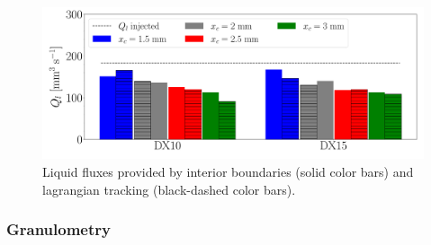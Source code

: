 \begin{figure}[ht]
	\centering
   \includegraphics[scale=0.25]{./part3_applications/figures_ch8_resolved/SPRAY_characterization/establishment_and_fluxes/fluxes_SLI_vs_IBs}
   \caption{Liquid fluxes provided by interior boundaries (solid color bars) and lagrangian tracking (black-dashed color bars).}
   \label{fig:ch8_fluxes_bargraph_IBs_vs_LGS}
\end{figure}


\subsubsection*{Granulometry}
\label{ch8:subsec_spray_char_granulo}

